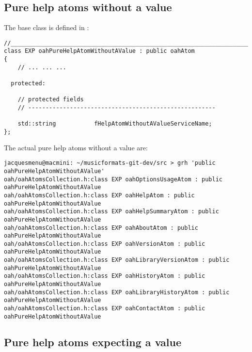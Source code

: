 \subsection{Pure help atoms without a value}

The base  class   is defined in :
\begin{lstlisting}[language=CPlusPlus]
//______________________________________________________________________________
class EXP oahPureHelpAtomWithoutAValue : public oahAtom
{
	// ... ... ...

  protected:

    // protected fields
    // ------------------------------------------------------

    std::string           fHelpAtomWithoutAValueServiceName;
};
\end{lstlisting}

The actual pure help atoms without a value are:
\begin{lstlisting}[language=Terminal]
jacquesmenu@macmini: ~/musicformats-git-dev/src > grh 'public oahPureHelpAtomWithoutAValue'
oah/oahAtomsCollection.h:class EXP oahOptionsUsageAtom : public oahPureHelpAtomWithoutAValue
oah/oahAtomsCollection.h:class EXP oahHelpAtom : public oahPureHelpAtomWithoutAValue
oah/oahAtomsCollection.h:class EXP oahHelpSummaryAtom : public oahPureHelpAtomWithoutAValue
oah/oahAtomsCollection.h:class EXP oahAboutAtom : public oahPureHelpAtomWithoutAValue
oah/oahAtomsCollection.h:class EXP oahVersionAtom : public oahPureHelpAtomWithoutAValue
oah/oahAtomsCollection.h:class EXP oahLibraryVersionAtom : public oahPureHelpAtomWithoutAValue
oah/oahAtomsCollection.h:class EXP oahHistoryAtom : public oahPureHelpAtomWithoutAValue
oah/oahAtomsCollection.h:class EXP oahLibraryHistoryAtom : public oahPureHelpAtomWithoutAValue
oah/oahAtomsCollection.h:class EXP oahContactAtom : public oahPureHelpAtomWithoutAValue
\end{lstlisting}


\subsection{Pure help atoms expecting a value}

